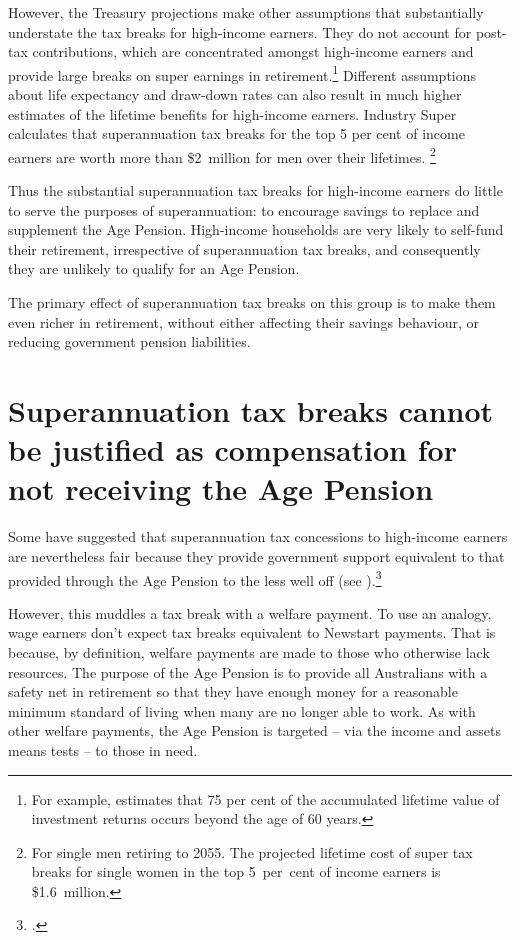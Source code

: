 \documentclass{grattanAlpha}
\begin{document}
However, the Treasury projections make other assumptions that substantially understate the tax breaks for high-income earners. They do not account for post-tax contributions, which are concentrated amongst high-income earners and provide large breaks on super earnings in retirement.\footnote{For example, \textcite{Blayney2015} estimates that 75 per cent of the accumulated lifetime value of investment returns occurs beyond the age of 60 years.}  Different assumptions about life expectancy and draw-down rates can also result in much higher estimates of the lifetime benefits for high-income earners.  Industry Super calculates that superannuation tax breaks for the top 5 per cent of income earners are worth more than \$2~million for men over their lifetimes.%
\footnote{For single men retiring to 2055. The projected lifetime cost of super tax breaks for single women in the top 5~per~cent of income earners is \$1.6~million.} 

Thus the substantial superannuation tax breaks for high-income earners do little to serve the purposes of superannuation: to encourage savings to replace and supplement the Age Pension. High-income households are very likely to self-fund their retirement, irrespective of superannuation tax breaks, and consequently they are unlikely to qualify for an Age Pension. 

The primary effect of superannuation tax breaks on this group is to make them even richer in retirement, without either affecting their savings behaviour, or reducing government pension liabilities.

\section{Superannuation tax breaks cannot be justified as compensation for not receiving the Age Pension}\label{sec:SUPER-3-6}
Some have suggested that superannuation tax concessions to high-income earners are nevertheless fair because they provide government support equivalent to that provided through the Age Pension to the less well off (see ).\footcite[][46]{ASFA2015TreasurySubmission}  

However, this muddles a tax break with a welfare payment. To use an analogy, wage earners don’t expect tax breaks equivalent to Newstart payments. That is because, by definition, welfare payments are made to those who otherwise lack resources. The purpose of the Age Pension is to provide all Australians with a safety net in retirement so that they have enough money for a reasonable minimum standard of living when many are no longer able to work. As with other welfare payments, the Age Pension is targeted – via the income and assets means tests – to those in need. 
\end{document}
